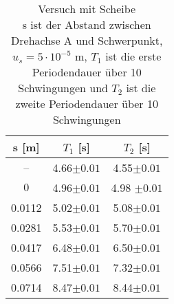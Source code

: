 \begin{table}[H]
    \centering
		\caption[Versuch mit Scheibe]{Versuch mit Scheibe\\
			s ist der Abstand zwischen Drehachse A und Schwerpunkt, $ u_{s}=5\cdot 10 ^{-5} $ m, $ T_{1} $ ist die erste Periodendauer über 10 Schwingungen und $ T_{2} $ ist die zweite Periodendauer über 10 Schwingungen}
		\begin{tabular}{|c|c|c|}
			\hline
			s [m] & $ T_{1} $ [s] & $ T_{2} $ [s]\\
			\hline
			-- & 4.66$ \pm0.01 $ & 4.55$ \pm0.01 $ \\
			\hline
			$ 0$&4.96$ \pm0.01 $  & 4.98 $ \pm0.01 $\\
			\hline
			0.0112& 5.02$ \pm0.01 $ & 5.08$ \pm0.01 $ \\
			\hline
			0.0281& 5.53$ \pm0.01 $ & 5.70$ \pm0.01 $ \\
			\hline
			0.0417& 6.48$ \pm0.01 $ & 6.50$ \pm0.01 $ \\
			\hline
			0.0566& 7.51$ \pm0.01 $ & 7.32$ \pm0.01 $ \\
			\hline
			0.0714& 8.47$ \pm0.01 $ & 8.44$ \pm0.01 $ \\
			\hline
		\end{tabular}
		\label{Tab: J_Tisch}
\end{table}